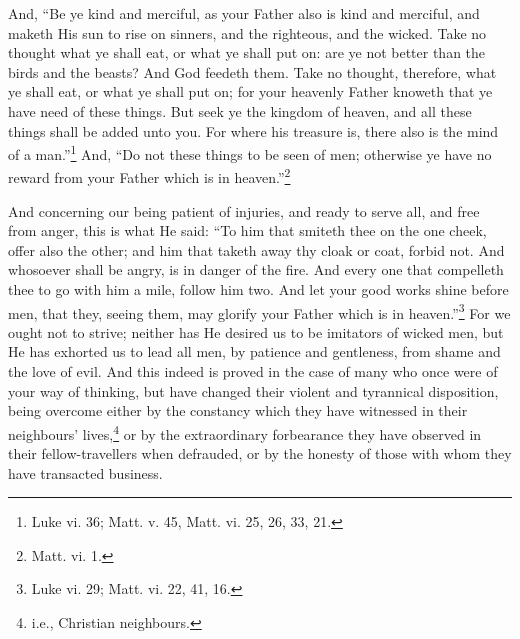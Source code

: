 And, “Be ye kind and merciful, as your Father also is kind and merciful, and maketh His sun to rise on sinners, and the righteous, and the wicked.  Take no thought what ye shall eat, or what ye shall put on: are ye not better than the birds and the beasts? And God feedeth them. Take no thought, therefore, what ye shall eat, or what ye shall put on; for your heavenly Father knoweth that ye have need of these things. But seek ye the kingdom of heaven, and all these things shall be added unto you. For where his treasure is, there also is the mind of a man.”\footnote{Luke vi. 36; Matt. v. 45, Matt. vi. 25, 26, 33, 21.} And, “Do not these things to be seen of men; otherwise ye have no reward from your Father which is in heaven.”\footnote{Matt. vi. 1.}


And concerning our being patient of injuries, and ready to serve all, and free from anger, this is what He said: “To him that smiteth thee on the one cheek, offer also the other; and him that taketh away thy cloak or coat, forbid not. And whosoever shall be angry, is in danger of the fire. And every one that compelleth thee to go with him a mile, follow him two. And let your good works shine before men, that they, seeing them, may glorify your Father which is in heaven.”\footnote{Luke vi. 29; Matt. vi. 22, 41, 16.} For we ought not to strive; neither has He desired us to be imitators of wicked men, but He has exhorted us to lead all men, by patience and gentleness, from shame and the love of evil. And this indeed is proved in the case of many who once were of your way of thinking, but have changed their violent and tyrannical disposition, being overcome either by the constancy which they have witnessed in their neighbours’ lives,\footnote{i.e., Christian neighbours.} or by the extraordinary forbearance they have observed in their fellow-travellers when defrauded, or by the honesty of those with whom they have transacted business.

